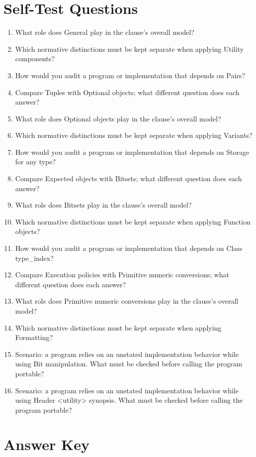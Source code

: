 \documentclass[11pt,letterpaper]{article}
\begin{document}
\section{Self-Test Questions}
\begin{enumerate}
\item What role does General play in the clause's overall model?
\item Which normative distinctions must be kept separate when applying Utility components?
\item How would you audit a program or implementation that depends on Pairs?
\item Compare Tuples with Optional objects; what different question does each answer?
\item What role does Optional objects play in the clause's overall model?
\item Which normative distinctions must be kept separate when applying Variants?
\item How would you audit a program or implementation that depends on Storage for any type?
\item Compare Expected objects with Bitsets; what different question does each answer?
\item What role does Bitsets play in the clause's overall model?
\item Which normative distinctions must be kept separate when applying Function objects?
\item How would you audit a program or implementation that depends on Class type\_\allowbreak{}index?
\item Compare Execution policies with Primitive numeric conversions; what different question does each answer?
\item What role does Primitive numeric conversions play in the clause's overall model?
\item Which normative distinctions must be kept separate when applying Formatting?
\item Scenario: a program relies on an unstated implementation behavior while using Bit manipulation. What must be checked before calling the program portable?
\item Scenario: a program relies on an unstated implementation behavior while using Header <utility> synopsis. What must be checked before calling the program portable?
\end{enumerate}
\clearpage\section{Answer Key}
\end{document}
